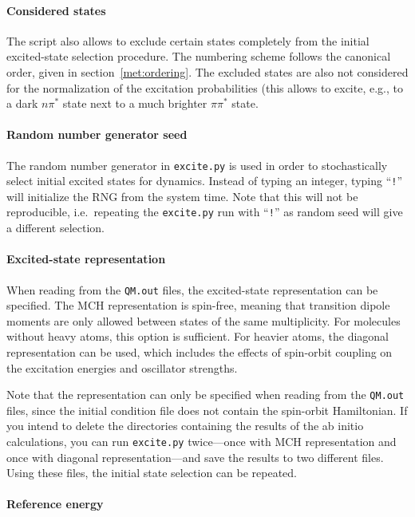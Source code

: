 \documentclass[a4paper,11pt,DIV=15,openany,twoside=false]{scrbook}
\newcommand{\ttt}[1]{\texttt{#1}}
\begin{document}
\paragraph{Considered states}

The script also allows to exclude certain states completely from the initial excited-state selection procedure. The numbering scheme follows the canonical order, given in section~\ref{met:ordering}. The excluded states are also not considered for the normalization of the excitation probabilities (this allows to excite, e.g., to a dark $n\pi^*$ state next to a much brighter $\pi\pi^*$ state.

\paragraph{Random number generator seed}

The random number generator in \ttt{excite.py} is used in order to stochastically select initial excited states for dynamics. Instead of typing an integer, typing ``\ttt{!}'' will initialize the RNG from the system time. Note that this will not be reproducible, i.e.\ repeating the \ttt{excite.py} run with ``\ttt{!}'' as random seed will give a different selection.

\paragraph{Excited-state representation}

When reading from the \ttt{QM.out} files, the excited-state representation can be specified. The MCH representation is spin-free, meaning that transition dipole moments are only allowed between states of the same multiplicity. For molecules without heavy atoms, this option is sufficient. For heavier atoms, the diagonal representation can be used, which includes the effects of spin-orbit coupling on the excitation energies and oscillator strengths. 

Note that the representation can only be specified when reading from the \ttt{QM.out} files, since the initial condition file does not contain the spin-orbit Hamiltonian. If you intend to delete the directories containing the results of the ab initio calculations, you can run \ttt{excite.py} twice---once with MCH representation and once with diagonal representation---and save the results to two different files. Using these files, the initial state selection can be repeated.

\paragraph{Reference energy}
\end{document}
